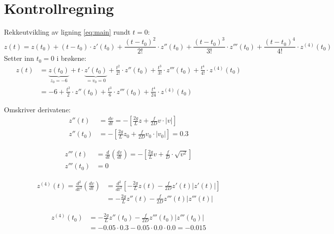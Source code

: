 \section{Kontrollregning} %
\label{sec:kontrollregning}
Rekkeutvikling av ligning \eqref{eq:main} rundt $t=0$:
\begin{equation}
  z(t)  = z(t_0) + (t-t_0) \cdot z'(t_0)
        + \frac{(t-t_0)^2}{2!} \cdot z''(t_0)
        + \frac{(t-t_0)^3}{3!} \cdot z'''(t_0)
        + \frac{(t-t_0)^4}{4!} \cdot z^{(4)}(t_0)
\end{equation}
Setter inn $t_0 = 0$ i brøkene:
\begin{align}
  z(t) &= \underbrace{z(t_0)}_{z_0=-6} 
        + t \cdot \underbrace{z'(t_0)}_{=v_0=0}
        + \frac{t^2}{2!} \cdot z''(t_0)
        + \frac{t^3}{3!} \cdot z'''(t_0)
        + \frac{t^4}{4!} \cdot z^{(4)}(t_0) \nonumber\\
       &= -6 + \frac{t^2}{2} \cdot z''(t_0)
        + \frac{t^3}{6} \cdot z'''(t_0)
        + \frac{t^4}{24} \cdot z^{(4)}(t_0) \label{eq:utv}
\end{align}

\noindent Omskriver derivatene:
\begin{align}
  z''(t)   & = \frac{dv}{dt}=-\left[\frac{2g}{L}z+\frac{f}{2D}v\cdot |v|\right]\\
  z''(t_0) & = -\left[\frac{2g}{L}z_0 + \frac{f}{2D}v_0 \cdot |v_0|\right]
             = 0.3 \label{eq:z2t0}
\end{align}

\begin{align}
  z'''(t) & =  \frac{d}{dt} \left( \frac{dv}{dt} \right)
          = -\left[\frac{2g}{L}v+\frac{f}{D}\cdot\sqrt{v^2}\right] \\
  z'''(t_0) & =  0 \label{eq:z3t0}
\end{align}

\begin{align}
  z^{(4)}(t) = \frac{d^2}{dt^2} \left( \frac{dv}{dt} \right)
   &= \frac{d^2}{dt^2} \left[-\frac{2g}{L}z(t)-\frac{f}{2D} z'(t)|z'(t)|\right]
    \nonumber \\ 
   &= - \frac{2g}{L} z''(t) - \frac{f}{2D} z'''(t) |z'''(t)|
\end{align}

\begin{align}
  z^{(4)}(t_0) &= - \frac{2g}{L} z''(t_0) - \frac{f}{2D} z'''(t_0) |z'''(t_0)|
  \nonumber \\
  &= -0.05 \cdot 0.3 - 0.05 \cdot 0.0 \cdot 0.0 = -0.015 \label{eq:z4t0}
\end{align}

